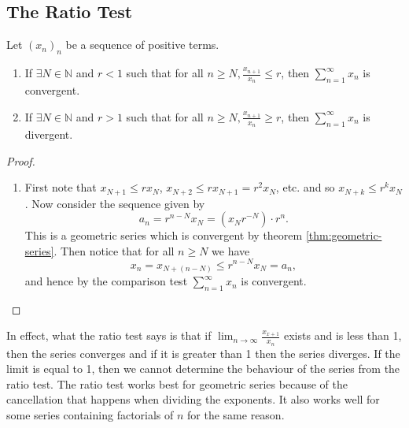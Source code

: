 \documentclass[../real_analysis.tex]{subfiles}
\begin{document}
        \subsection{The Ratio Test}\label{subsec:ratio-test}
            \begin{theorem}
                Let $(x_n)_n$ be a sequence of positive terms.
                \begin{enumerate}[label={\upshape(\roman*)}]
                    \item If $\exists N\in\mathbb{N}$ and $r<1$ such that for all $n\geq N, \frac{x_{n+1}}{x_n}\leq r$, then $\sum_{n=1}^\infty x_n$ is convergent.
                    \item If $\exists N\in\mathbb{N}$ and $r>1$ such that for all $n\geq N, \frac{x_{n+1}}{x_n}\geq r$, then $\sum_{n=1}^\infty x_n$ is divergent.
                    \end{enumerate}
            \end{theorem}
            \begin{proof}\\
                \begin{enumerate}[label={\upshape(\roman*)}]
                    \item First note that $x_{N+1}\leq rx_N$, $x_{N+2}\leq rx_{N+1}=r^2x_N$, etc. and so $x_{N+k}\leq r^kx_N$. Now consider the sequence given by
                    \begin{equation}
                        a_n=r^{n-N}x_N=(x_Nr^{-N})\cdot r^n.
                    \end{equation}
                    This is a geometric series which is convergent by theorem \ref{thm:geometric-series}. Then notice that for all $n\geq N$ we have
                    \begin{equation}
                        x_n=x_{N+(n-N)}\leq r^{n-N}x_N=a_n,
                    \end{equation}
                    and hence by the comparison test $\sum_{n=1}^\infty x_n$ is convergent.
                \end{enumerate}
            \end{proof}
            In effect, what the ratio test says is that if $\lim_{n\to\infty}\frac{x_{x+1}}{x_n}$ exists and is less than 1, then the series converges and if it is greater than 1 then the series diverges. If the limit is equal to 1, then we cannot determine the behaviour of the series from the ratio test. The ratio test works best for geometric series because of the cancellation that happens when dividing the exponents. It also works well for some series containing factorials of $n$ for the same reason.
\end{document}
